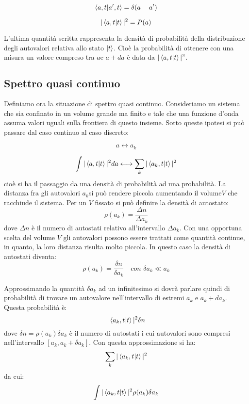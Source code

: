 \begin{equation}
\braket{a,t|a',t}=\delta(a-a')
\end{equation}

\begin{equation}
|\braket{a,t|t}|^2=P(a)
\end{equation}

L'ultima quantità scritta rappresenta la densità di probabilità della distribuzione degli autovalori relativa allo stato $\ket{t}$. Cioè la probabilità di ottenere con una misura un valore compreso tra $a$e $a+da$ è data da $|\braket{a,t|t}|^2$.

\subsection{Spettro quasi continuo}
Definiamo ora la situazione di spettro quasi continuo. Consideriamo un sistema
che sia confinato in un volume grande ma finito e tale che una funzione d'onda
assuma valori uguali sulla frontiera di questo insieme. Sotto queste ipotesi si
può passare dal caso continuo al caso discreto:

\begin{equation}
a \longleftrightarrow a_k
\end{equation}

\begin{equation}
\int|\braket{a,t|t}|^2da \longleftrightarrow \sum_{k}|\braket{a_{k},t|t}|^2
\end{equation}
cioè si ha il passaggio da una densità di probabilità ad una probabilità. La
distanza fra gli autovalori $a_k$si può rendere piccola aumentando il volume$V$
che racchiude il sistema. Per un $V$ fissato si può definire la densità di
autostato:
\begin{equation}
\rho(a_k)=\frac{\Delta n}{\Delta a_{k}}
\end{equation}
dove $\Delta n$ è il numero di autostati relativo all'intervallo $\Delta a_k$.
Con una opportuna scelta del volume $V$ gli autovalori possono essere trattati
come quantità continue, in quanto, la loro distanza risulta molto piccola. In
questo caso la densità di autostati diventa:
\begin{equation}
\rho(a_k)=\frac{\delta n}{\delta a_k}\quad \textit{con }\delta a_k\ll a_k
\end{equation}

Approssimando la quantità $\delta a_k$ ad un infinitesimo si dovrà parlare
quindi di probabilità di trovare un autovalore nell'intervallo di estremi
$a_k$ e $a_k+da_k$. Questa probabilità è:
\begin{equation}
|\braket{a_k,t|t}|^2\delta n
\end{equation}
dove $\delta n= \rho(a_k)\delta a_k$ è il numero di autostati i cui autovalori
sono compresi nell'intervallo $[a_k,a_k+\delta a_k]$. Con questa approssimazione
si ha:
\begin{equation}
\sum_k|\braket{a_k,t|t}|^2
\end{equation}
da cui:
\begin{equation}
\int|\braket{a_k,t|t}|^2\rho(a_k)\delta a_k
\end{equation}

